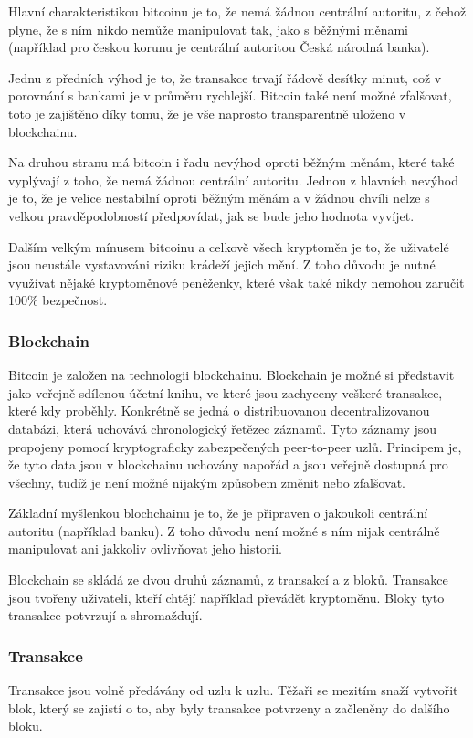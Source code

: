 \documentclass[thesis=B,czech]{FITthesis}[2019/03/21]
\begin{document}
Hlavní charakteristikou bitcoinu je to, že nemá žádnou centrální autoritu, z čehož plyne, že s ním nikdo nemůže manipulovat tak, jako s běžnými měnami (například pro českou korunu je centrální autoritou Česká národná banka).

Jednu z předních výhod je to, že transakce trvají řádově desítky minut, což v porovnání s bankami je v průměru rychlejší. Bitcoin také není možné zfalšovat, toto je zajištěno díky tomu, že je vše naprosto transparentně uloženo v blockchainu.

Na druhou stranu má bitcoin i řadu nevýhod oproti běžným měnám, které také vyplývají z toho, že nemá žádnou centrální autoritu. Jednou z hlavních nevýhod je to, že je velice nestabilní oproti běžným měnám a v žádnou chvíli nelze s velkou pravděpodobností předpovídat, jak se bude jeho hodnota vyvíjet. 

Dalším velkým mínusem bitcoinu a celkově všech kryptoměn je to, že uživatelé jsou neustále vystavováni riziku krádeží jejich mění. Z toho důvodu je nutné využívat nějaké kryptoměnové peněženky, které však také nikdy nemohou zaručit 100\% bezpečnost.\cite{Finex}

\subsubsection{Blockchain}
Bitcoin je založen na technologii blockchainu. Blockchain je možné si představit jako veřejně sdílenou účetní knihu, ve které jsou zachyceny veškeré transakce, které kdy proběhly. Konkrétně se jedná o distribuovanou decentralizovanou databázi, která uchovává chronologický řetězec záznamů. Tyto záznamy jsou propojeny pomocí kryptograficky zabezpečených peer-to-peer uzlů. Principem je, že tyto data jsou v blockchainu uchovány napořád a jsou veřejně dostupná pro všechny, tudíž je není možné nijakým způsobem změnit nebo zfalšovat. \cite{Bitcoin_how_it_works}

Základní myšlenkou blochchainu je to, že je připraven o jakoukoli centrální autoritu (například banku). Z toho důvodu není možné s ním nijak centrálně manipulovat ani jakkoliv ovlivňovat jeho historii.

Blockchain se skládá ze dvou druhů záznamů, z transakcí a z bloků. Transakce jsou tvořeny uživateli, kteří chtějí například převádět kryptoměnu. Bloky tyto transakce potvrzují a shromažďují. \cite{Finex_blockchain}

\subsubsection{Transakce}
Transakce jsou volně předávány od uzlu k uzlu. Těžaři se mezitím snaží vytvořit blok, který se zajistí o to, aby byly transakce potvrzeny a začleněny do dalšího bloku.
\end{document}
